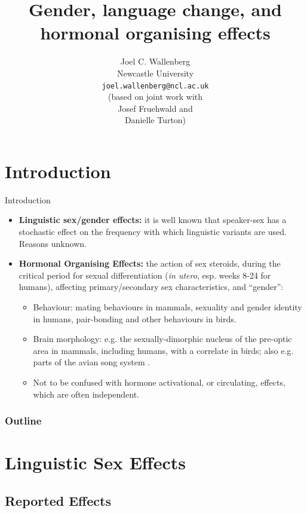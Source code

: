 \documentclass[hyperref={pdfpagelabels=false}]{beamer}
\title{Gender, language change, and hormonal organising effects}
\author{Joel C. Wallenberg\\Newcastle University\\\texttt{joel.wallenberg@ncl.ac.uk}\\\vspace*{5mm}(based on joint work with \\Josef Fruehwald and \\Danielle Turton)}
\begin{document}
\begin{frame}[plain]
\titlepage
\end{frame}


\section{Introduction}
\begin{frame}{Introduction}

	
	\begin{itemize}
		\item \textbf{Linguistic sex/gender effects:} it is well known that speaker-sex has a stochastic effect on the frequency with which linguistic variants are used. Reasons unknown.
		\item \textbf{Hormonal Organising Effects:} the action of sex steroids, during the critical period for sexual differentiation 
		(\textsl{in utero}, esp. weeks 8-24 for humans), affecting primary/secondary sex characteristics, and ``gender'':
			\begin{itemize}
				\item Behaviour: mating behaviours in mammals, sexuality and gender identity in humans, pair-bonding and other behaviours in birds.
				\item Brain morphology: e.g. the sexually-dimorphic nucleus of the pre-optic area in mammals, including humans, with a correlate in birds; also e.g. parts of the avian song system \citep[][]{balthazartetal2009}.
				\item Not to be confused with hormone activational, or circulating, effects, which are often independent.
			\end{itemize}
	\end{itemize}
	
\end{frame}


\begin{frame}
\frametitle{Outline}
\tableofcontents
\end{frame}


\section{Linguistic Sex Effects}
\subsection{Reported Effects}
\end{document}
